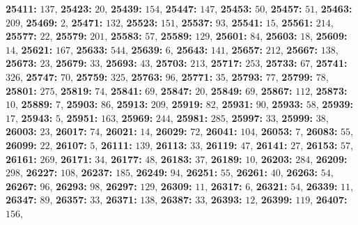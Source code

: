 \textsf{\bfseries 25411:} $137$, \textsf{\bfseries 25423:} $20$, \textsf{\bfseries 25439:} $154$, \textsf{\bfseries 25447:} $147$, \textsf{\bfseries 25453:} $50$, \textsf{\bfseries 25457:} $51$, \textsf{\bfseries 25463:} $209$, \textsf{\bfseries 25469:} $2$, \textsf{\bfseries 25471:} $132$, \textsf{\bfseries 25523:} $151$, \textsf{\bfseries 25537:} $93$, \textsf{\bfseries 25541:} $15$, \textsf{\bfseries 25561:} $214$, \textsf{\bfseries 25577:} $22$, \textsf{\bfseries 25579:} $201$, \textsf{\bfseries 25583:} $57$, \textsf{\bfseries 25589:} $129$, \textsf{\bfseries 25601:} $84$, \textsf{\bfseries 25603:} $18$, \textsf{\bfseries 25609:} $14$, \textsf{\bfseries 25621:} $167$, \textsf{\bfseries 25633:} $544$, \textsf{\bfseries 25639:} $6$, \textsf{\bfseries 25643:} $141$, \textsf{\bfseries 25657:} $212$, \textsf{\bfseries 25667:} $138$, \textsf{\bfseries 25673:} $23$, \textsf{\bfseries 25679:} $33$, \textsf{\bfseries 25693:} $43$, \textsf{\bfseries 25703:} $213$, \textsf{\bfseries 25717:} $253$, \textsf{\bfseries 25733:} $67$, \textsf{\bfseries 25741:} $326$, \textsf{\bfseries 25747:} $70$, \textsf{\bfseries 25759:} $325$, \textsf{\bfseries 25763:} $96$, \textsf{\bfseries 25771:} $35$, \textsf{\bfseries 25793:} $77$, \textsf{\bfseries 25799:} $78$, \textsf{\bfseries 25801:} $275$, \textsf{\bfseries 25819:} $74$, \textsf{\bfseries 25841:} $69$, \textsf{\bfseries 25847:} $20$, \textsf{\bfseries 25849:} $69$, \textsf{\bfseries 25867:} $112$, \textsf{\bfseries 25873:} $10$, \textsf{\bfseries 25889:} $7$, \textsf{\bfseries 25903:} $86$, \textsf{\bfseries 25913:} $209$, \textsf{\bfseries 25919:} $82$, \textsf{\bfseries 25931:} $90$, \textsf{\bfseries 25933:} $58$, \textsf{\bfseries 25939:} $17$, \textsf{\bfseries 25943:} $5$, \textsf{\bfseries 25951:} $163$, \textsf{\bfseries 25969:} $244$, \textsf{\bfseries 25981:} $285$, \textsf{\bfseries 25997:} $33$, \textsf{\bfseries 25999:} $38$, \textsf{\bfseries 26003:} $23$, \textsf{\bfseries 26017:} $74$, \textsf{\bfseries 26021:} $14$, \textsf{\bfseries 26029:} $72$, \textsf{\bfseries 26041:} $104$, \textsf{\bfseries 26053:} $7$, \textsf{\bfseries 26083:} $55$, \textsf{\bfseries 26099:} $22$, \textsf{\bfseries 26107:} $5$, \textsf{\bfseries 26111:} $139$, \textsf{\bfseries 26113:} $33$, \textsf{\bfseries 26119:} $47$, \textsf{\bfseries 26141:} $27$, \textsf{\bfseries 26153:} $57$, \textsf{\bfseries 26161:} $269$, \textsf{\bfseries 26171:} $34$, \textsf{\bfseries 26177:} $48$, \textsf{\bfseries 26183:} $37$, \textsf{\bfseries 26189:} $10$, \textsf{\bfseries 26203:} $284$, \textsf{\bfseries 26209:} $298$, \textsf{\bfseries 26227:} $108$, \textsf{\bfseries 26237:} $185$, \textsf{\bfseries 26249:} $94$, \textsf{\bfseries 26251:} $55$, \textsf{\bfseries 26261:} $40$, \textsf{\bfseries 26263:} $54$, \textsf{\bfseries 26267:} $96$, \textsf{\bfseries 26293:} $98$, \textsf{\bfseries 26297:} $129$, \textsf{\bfseries 26309:} $11$, \textsf{\bfseries 26317:} $6$, \textsf{\bfseries 26321:} $54$, \textsf{\bfseries 26339:} $11$, \textsf{\bfseries 26347:} $89$, \textsf{\bfseries 26357:} $33$, \textsf{\bfseries 26371:} $138$, \textsf{\bfseries 26387:} $33$, \textsf{\bfseries 26393:} $12$, \textsf{\bfseries 26399:} $119$, \textsf{\bfseries 26407:} $156$, 
